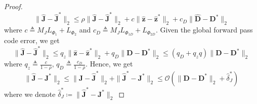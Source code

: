 \documentclass[10pt]{article} %
\newcommand{\D}{{\bm D}}
\newcommand{\J}{{\bm J}}
\newcommand{\z}{{\bm z}}
\begin{document}
\begin{proof}
\begin{equation*}
\| \hat \J - \hat \J^{\ast} \|_2 \leq \rho \| \hat \J - \hat \J^{\ast} \|_2 + c \| \hat \z - \hat \z^{\ast} \|_2 + c_{D} \| \hat \D - \D^{\ast} \|_2
\end{equation*}
where $c \triangleq M_J L_{\Phi_1} + L_{\Phi_2}$ and $c_D \triangleq M_J L_{\Phi_{1D}} + L_{\Phi_{2D}}$. Given the global forward pass code error, we get
\begin{equation}
\| \hat \J - \hat \J^{\ast} \|_2 \leq q_z \| \hat \z - \hat \z^{\ast} \|_2 + q_D \| \D - \D^{\ast} \|_2 \leq (q_D + q_z q) \| \D - \D^{\ast} \|_2
\end{equation}
where $q_z \triangleq \frac{c}{1 - \rho}$, $q_D \triangleq \frac{c_D}{1 - \rho}$. Hence, we get
\begin{equation}
\| \hat \J - \J^{\ast} \|_2 \leq \| \hat \J - \hat \J^{\ast} \|_2 + \| \hat \J^{\ast} - \J^{\ast} \|_2 \leq \mathcal{O}(\| \D - \D^{\ast} \|_2 + \hat \delta_J^{\ast})
\end{equation}
where we denote $\hat \delta_J^{\ast} \coloneqq \| \hat \J^{\ast} - \J^{\ast} \|_2$
\end{proof}
%


%
\end{document}
